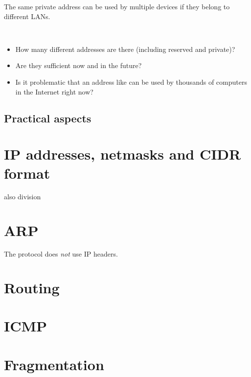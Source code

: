 \begin{remark}
The same private address can be used by multiple devices if they belong to different LANs.
\end{remark}

\begin{exercise}\ \\[-0.5cm]
\begin{itemize}
\item How many different  addresses are there (including reserved and private)? 
\item Are they sufficient now and in the future?
\item Is it problematic that an address like  can be used by thousands
  of computers in the Internet right now?
\end{itemize}
\end{exercise}


\subsection*{Practical aspects}

\section{IP addresses, netmasks and CIDR format}\label{sec:layer3:cidr}
also division

\section{ARP}
\begin{remark}
The  protocol does \textit{not} use IP headers.
\end{remark}

\section{Routing}

\section{ICMP}

\section{Fragmentation}


